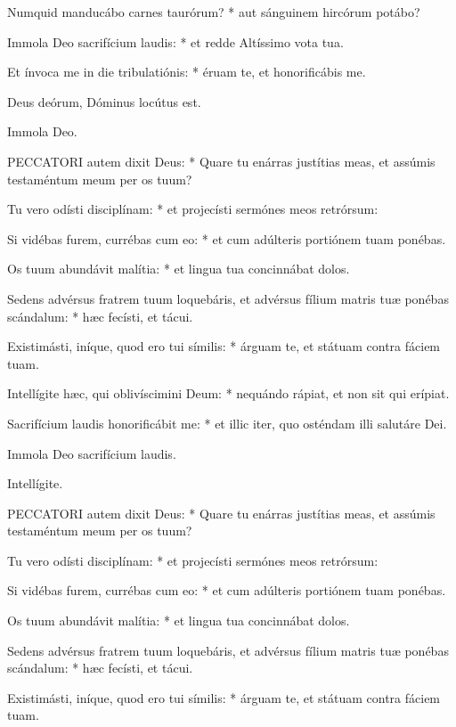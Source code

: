 Numquid manducábo carnes taurórum? * aut sánguinem hircórum potábo?

Immola Deo sacrifícium laudis: * et redde Altíssimo vota tua.

Et ínvoca me in die tribulatiónis: * éruam te, et honorificábis me.

 Deus deórum, Dóminus locútus est.

 Immola Deo.


\lettrine[lines=2]{P}{ECCATORI} autem dixit Deus: * Quare tu enárras justítias meas, et assúmis testaméntum meum per os tuum?

Tu vero odísti disciplínam: * et projecísti sermónes meos retrórsum:

Si vidébas furem, currébas cum eo: * et cum adúlteris portiónem tuam ponébas.

Os tuum abundávit malítia: * et lingua tua concinnábat dolos.

Sedens advérsus fratrem tuum loquebáris, et advérsus fílium matris tuæ ponébas scándalum: * hæc fecísti, et tácui.

Existimásti, iníque, quod ero tui símilis: * árguam te, et státuam contra fáciem tuam.

Intellígite hæc, qui oblivíscimini Deum: * nequándo rápiat, et non sit qui erípiat.

Sacrifícium laudis honorificábit me: * et illic iter, quo osténdam illi salutáre Dei.

 Immola Deo sacrifícium laudis.

 Intellígite.


\lettrine[lines=2]{P}{ECCATORI} autem dixit Deus: * Quare tu enárras justítias meas, et assúmis testaméntum meum per os tuum?

Tu vero odísti disciplínam: * et projecísti sermónes meos retrórsum:

Si vidébas furem, currébas cum eo: * et cum adúlteris portiónem tuam ponébas.

Os tuum abundávit malítia: * et lingua tua concinnábat dolos.

Sedens advérsus fratrem tuum loquebáris, et advérsus fílium matris tuæ ponébas scándalum: * hæc fecísti, et tácui.

Existimásti, iníque, quod ero tui símilis: * árguam te, et státuam contra fáciem tuam.

